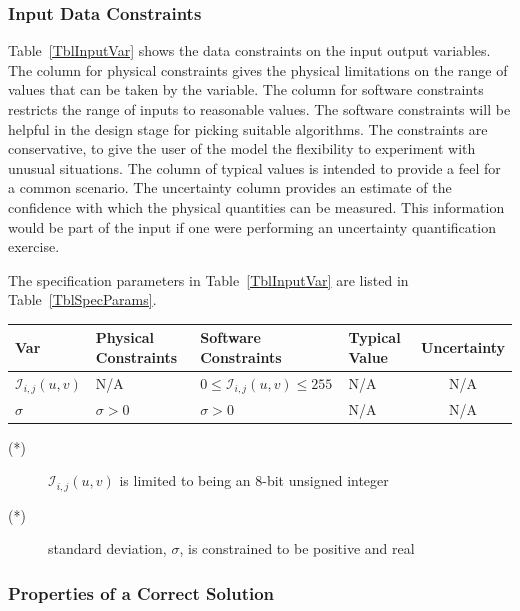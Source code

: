 \documentclass[12pt]{article}
\begin{document}
\subsubsection{Input Data Constraints} \label{sec_DataConstraints}    

Table~\ref{TblInputVar} shows the data constraints on the input output
variables.  The column for physical constraints gives the physical limitations
on the range of values that can be taken by the variable.  The column for
software constraints restricts the range of inputs to reasonable values.  The
software constraints will be helpful in the design stage for picking suitable
algorithms.  The constraints are conservative, to give the user of the model the
flexibility to experiment with unusual situations.  The column of typical values
is intended to provide a feel for a common scenario.  The uncertainty column
provides an estimate of the confidence with which the physical quantities can be
measured.  This information would be part of the input if one were performing an
uncertainty quantification exercise.

The specification parameters in Table~\ref{TblInputVar} are listed in
Table~\ref{TblSpecParams}.

\begin{table}[!h]
  \caption{Input Variables} \label{TblInputVar}
  \renewcommand{\arraystretch}{1.2}
\noindent \begin{longtable*}{l l l l c} 
  \toprule
  \textbf{Var} & \textbf{Physical Constraints} & \textbf{Software Constraints} &
                             \textbf{Typical Value} & \textbf{Uncertainty}\\
  \midrule 
  $\mathit{\mathcal{I}_{i, j}(u,v)}$ & N/A & $0 \leq \mathit{\mathcal{I}_{i, j}(u,v)} \leq 255$ 
  & N/A & N/A  %
  \\
  $\sigma$ & $\sigma > 0$ & $\sigma > 0 $ & N/A & N/A %
  \\
  \bottomrule
\end{longtable*}
\end{table}
\noindent 
\begin{description}
\item[(*)] $\mathit{\mathcal{I}_{i, j}(u,v)}$ is limited to being an 8-bit unsigned integer
\item[(*)] standard deviation, $\sigma$, is constrained to be positive and real
\end{description}

\subsubsection{Properties of a Correct Solution} \label{sec_CorrectSolution}
\end{document}
